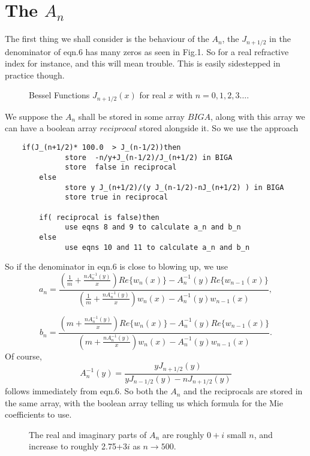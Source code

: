 \documentclass[12pt]{article}
\begin{document}
\section{The $A_n$}

The first thing we shall consider is the behaviour of the $A_n$, the 
$J_{n+1/2}$ in the denominator of eqn.6 has many zeros as seen in Fig.1.
So  for a real refractive index for instance, and this will mean trouble. 
This is easily sidestepped in practice though.

\vspace*{10cm}
\begin{figure}[htb]
\caption{ Bessel Functions $J_{n+1/2}(x)$ for real $x$ with $ n=0,1,2,3 \ldots$.}
\end{figure}

We suppose the $A_n$ shall be stored in some array $BIGA$, along with this array we can have a boolean array  $reciprocal$ stored alongside it. So we use the approach

\begin{verbatim}
	if(J_(n+1/2)* 100.0  > J_(n-1/2))then
              store  -n/y+J_(n-1/2)/J_(n+1/2) in BIGA
              store  false in reciprocal
        else
              store y J_(n+1/2)/(y J_(n-1/2)-nJ_(n+1/2) ) in BIGA
              store true in reciprocal

        if( reciprocal is false)then
              use eqns 8 and 9 to calculate a_n and b_n
        else
              use eqns 10 and 11 to calculate a_n and b_n
\end{verbatim}

So if the denominator in eqn.6 is close to blowing up, we use
\begin{equation}
a_n=\frac{ \left ( 
\frac{1}{m}+\frac{n A^{-1}_n(y)}{x}
 \right )
Re \lbrace w_n(x) \rbrace - A^{-1}_n(y)Re \lbrace w_{n-1}(x) \rbrace
}
{ \left ( 
\frac{1}{m}+\frac{n A^{-1}_n(y)}{x} 
\right )
 w_n(x) - A^{-1}_n(y) w_{n-1}(x) },
\end{equation}

\begin{equation}
b_n=\frac{ \left ( 
m +\frac{n A^{-1}_n(y)}{x}
 \right )
Re \lbrace w_n(x) \rbrace -A^{-1}_n(y) Re \lbrace w_{n-1}(x) \rbrace
}
{ \left ( 
m +\frac{n A^{-1}_n(y)}{x} 
\right )
 w_n(x) - A^{-1}_n(y) w_{n-1}(x) }.
\end{equation}
Of course,
\begin{equation}
A_n^{-1}(y)=\frac{ y J_{n+1/2}(y)}
                 { y J_{n-1/2}(y)-n J_{n+1/2}(y) }
\end{equation}
follows immediately from eqn.6. So both the $A_n$ and the reciprocals are stored in the same array, with the boolean array telling us which formula for
the Mie coefficients to use.
\vspace*{11cm}
\begin{figure}[htb]
\caption{ The real and imaginary parts of $A_n$ are roughly $0+i$
 small $n$, and increase to roughly 2.75+3$i$ as $n \rightarrow 500$.}
\end{figure}
\end{document}
